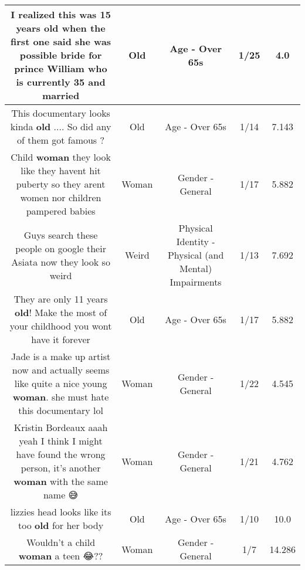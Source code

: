 \documentclass[11pt]{article}
\newlength\mylength
\begin{document}
\begin{center}
\begin{longtable}{|C{.65\mylength}|C{.30\mylength}|C{.12\mylength}|C{.12\mylength}|C{.12\mylength}|}
  \small I realized this was 15 years \textbf{old} when the first one said she was possible bride for prince William who is currently 35 and married\normalsize   & Old & Age - Over 65s & 1/25 & 4.0 \\  \hline
  \small This documentary looks kinda \textbf{old} .... So did any of them got famous ?\normalsize   & Old & Age - Over 65s & 1/14 & 7.143 \\  \hline
  \small Child \textbf{woman} they look like they havent hit puberty so they arent women nor children pampered babies\normalsize   & Woman & Gender - General & 1/17 & 5.882 \\  \hline
  \small Guys search these people on google their Asiata now they look so weird\normalsize   & Weird & Physical Identity - Physical (and Mental) Impairments & 1/13 & 7.692 \\  \hline
  \small They are only 11 years \textbf{old}! Make the most of your childhood you wont have it forever\normalsize   & Old & Age - Over 65s & 1/17 & 5.882 \\  \hline
  \small Jade is a make up artist now and actually seems like quite a nice young \textbf{woman}. she must hate this documentary lol\normalsize   & Woman & Gender - General & 1/22 & 4.545 \\  \hline
  \small Kristin Bordeaux aaah yeah I think I might have found the wrong person, it's another \textbf{woman} with the same name 😅\normalsize   & Woman & Gender - General & 1/21 & 4.762 \\  \hline
  \small lizzies head looks like its too \textbf{old} for her body\normalsize   & Old & Age - Over 65s & 1/10 & 10.0 \\  \hline
  \small Wouldn't a child \textbf{woman} a teen 😂??\normalsize   & Woman & Gender - General & 1/7 & 14.286 \\  \hline

\end{longtable}
\end{center}
\end{document}

